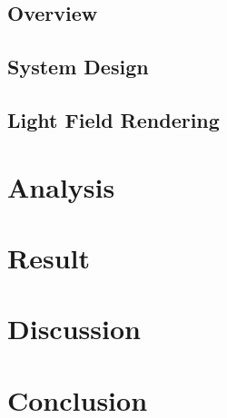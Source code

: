 \documentclass[10pt,twocolumn,letterpaper]{article}
\begin{document}
\subsection{Overview}


\subsection{System Design}


\subsection{Light Field Rendering}



\section{Analysis}



\section{Result}



\section{Discussion}



\section{Conclusion}



\end{document}
